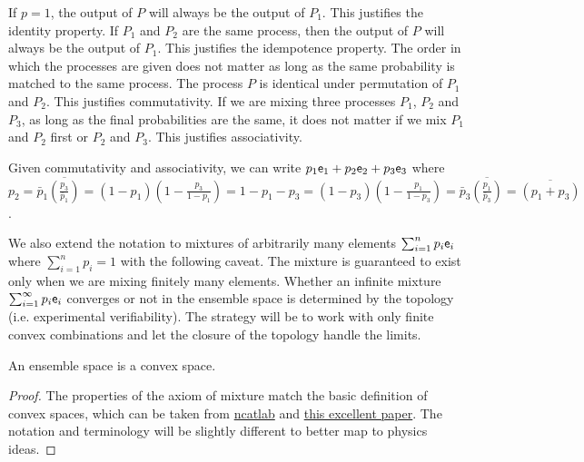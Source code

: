 \begin{mathSection}
\begin{justification}
	If $p=1$, the output of $P$ will always be the output of $P_1$. This justifies the identity property. If $P_1$ and $P_2$ are the same process, then the output of $P$ will always be the output of $P_1$. This justifies the idempotence property. The order in which the processes are given does not matter as long as the same probability is matched to the same process. The process $P$ is identical under permutation of $P_1$ and $P_2$. This justifies commutativity. If we are mixing three processes $P_1$, $P_2$ and $P_3$, as long as the final probabilities are the same, it does not matter if we mix $P_1$ and $P_2$ first or $P_2$ and $P_3$. This justifies associativity.
\end{justification}

\begin{remark}
	Given commutativity and associativity, we can write $p_1 \ens[e]_1 + p_2 \ens[e]_2 + p_3 \ens_3$ where $p_2 = \bar{p}_1\overline{\left(\frac{p_3}{\bar{p}_1}\right)} = (1 - p_1)\left(1 - \frac{p_3}{1-p_1}\right) = 1 - p_1 - p_3 = (1 - p_3)\left(1 - \frac{p_1}{1-p_3}\right) = \bar{p}_3\overline{\left(\frac{p_1}{\bar{p}_3}\right)} = \overline{\left(p_1 + p_3\right)}$.
	
	We also extend the notation to mixtures of arbitrarily many elements $\sum_{i=1}^n p_i \ens_i$ where $\sum_{i=1}^n p_i = 1$ with the following caveat. The mixture is guaranteed to exist only when we are mixing finitely many elements. Whether an infinite mixture $\sum_{i=1}^\infty p_i \ens_i$ converges or not in the ensemble space is determined by the topology (i.e. experimental verifiability). The strategy will be to work with only finite convex combinations and let the closure of the topology handle the limits.
\end{remark}

\begin{coro}
	An ensemble space is a convex space.
\end{coro}

\begin{proof}
	The properties of the axiom of mixture match the basic definition of convex spaces, which can be taken from \href{https://ncatlab.org/nlab/show/convex+space}{ncatlab} and \href{https://arxiv.org/abs/0903.5522}{this excellent paper}.  The notation and terminology will be slightly different to better map to physics ideas. 
\end{proof}

\end{mathSection}

